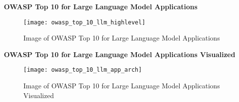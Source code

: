 
\textbf{OWASP Top 10 for Large Language Model Applications}
\begin{figure}[ht]
  \centering
  \texttt{[image: owasp\_top\_10\_llm\_highlevel]}
  \caption{Image of OWASP Top 10 for Large Language Model Applications}
  \label{fig:owasp-top-10-llm-highlevel}
\end{figure}

\clearpage
\textbf{OWASP Top 10 for Large Language Model Applications Visualized}
\begin{figure}[ht]
  \centering
  \texttt{[image: owasp\_top\_10\_llm\_app\_arch]}
  \caption{Image of OWASP Top 10 for Large Language Model Applications Visualized}
  \label{fig:owasp-top-10-llm-visualized}
\end{figure}

